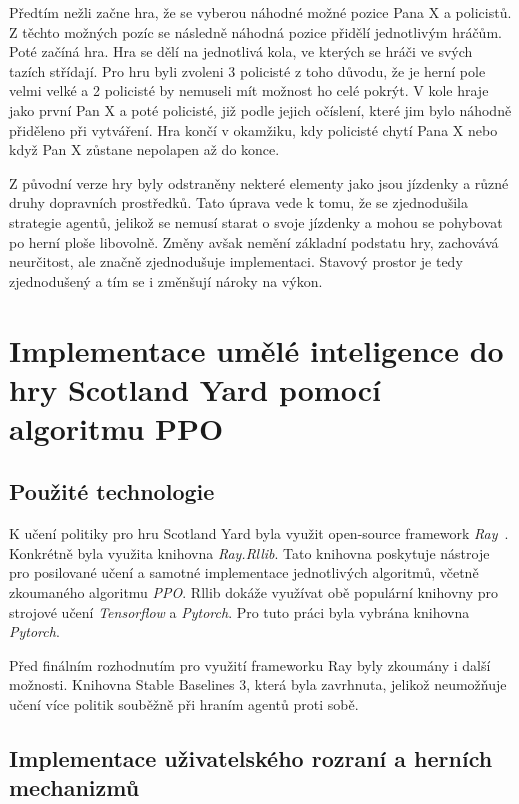 Předtím nežli začne hra, že se vyberou náhodné možné pozice Pana X a policistů.
Z těchto možných pozíc se následně náhodná pozice přidělí jednotlivým hráčům.
Poté začíná hra.
Hra se dělí na jednotlivá kola, ve kterých se hráči ve svých tazích střídají.
Pro hru byli zvoleni 3 policisté z toho důvodu, že je herní pole velmi velké a 2 policisté by nemuseli mít možnost ho celé pokrýt.
V kole hraje jako první Pan X a poté policisté, již podle jejich očíslení, které jim bylo náhodně přiděleno při vytváření.
Hra končí v okamžiku, kdy policisté chytí Pana X nebo když Pan X zůstane nepolapen až do konce.

Z původní verze hry byly odstraněny nekteré elementy jako jsou jízdenky a různé druhy dopravních prostředků.
Tato úprava vede k tomu, že se zjednodušila strategie agentů, jelikož se nemusí starat o svoje jízdenky a mohou se pohybovat po herní ploše libovolně.
Změny avšak nemění základní podstatu hry, zachovává neurčitost, ale značně zjednodušuje implementaci.
Stavový prostor je tedy zjednodušený a tím se i změnšují nároky na výkon.

\section{Implementace umělé inteligence do hry Scotland Yard pomocí algoritmu PPO}
\label{sec:implementace}

\subsection{Použité technologie}\label{subsec:pouzite-technologie}
K učení politiky pro hru Scotland Yard byla využit open-source framework \emph{Ray}~\cite{Ray}.
Konkrétně byla využita knihovna \emph{Ray.Rllib}.
Tato knihovna poskytuje nástroje pro posilované učení a samotné implementace jednotlivých algoritmů, včetně zkoumaného algoritmu \emph{PPO}.
Rllib dokáže využívat obě populární knihovny pro strojové učení \emph{Tensorflow} a \emph{Pytorch}.
Pro tuto práci byla vybrána knihovna \emph{Pytorch}.

Před finálním rozhodnutím pro využití frameworku Ray byly zkoumány i další možnosti.
Knihovna Stable Baselines 3, která byla zavrhnuta, jelikož neumožňuje učení více politik souběžně při hraním agentů proti sobě.

\subsection{Implementace uživatelského rozraní a herních mechanizmů}\label{subsec:implementace-uzivatelskeho-rozrani-a-hernich-mechanizmu}

